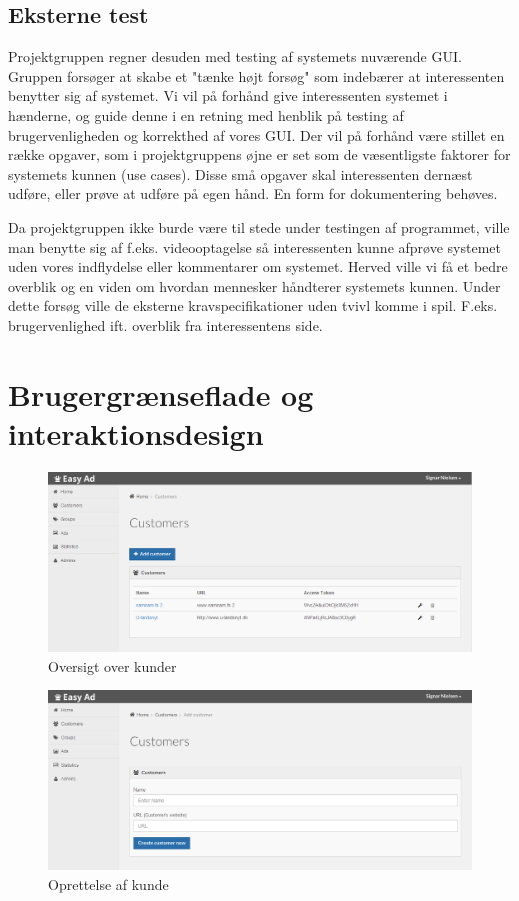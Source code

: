 \documentclass[a4paper,12pt]{article}
\begin{document}
\subsection{Eksterne test}
Projektgruppen regner desuden med testing af systemets nuværende GUI. Gruppen forsøger at skabe et "tænke højt forsøg" som indebærer at interessenten benytter sig af systemet. Vi vil på forhånd give interessenten systemet i hænderne, og guide denne i en retning med henblik på testing af brugervenligheden og korrekthed af vores GUI. Der vil på forhånd være stillet en række opgaver, som i projektgruppens øjne er set som de væsentligste faktorer for systemets kunnen (use cases). Disse små opgaver skal interessenten dernæst udføre, eller prøve at udføre på egen hånd. En form for dokumentering behøves. 

Da projektgruppen ikke burde være til stede under testingen af programmet, ville man benytte sig af f.eks. videooptagelse så interessenten kunne afprøve systemet uden vores indflydelse eller kommentarer om systemet. Herved ville vi få et bedre overblik og en viden om hvordan mennesker håndterer systemets kunnen.
Under dette forsøg ville de eksterne kravspecifikationer uden tvivl komme i spil. F.eks. brugervenlighed ift. overblik fra
interessentens side.




\newpage

\section{Brugergrænseflade og interaktionsdesign}
\begin{figure}[p]
  \centering
    \includegraphics[width=\textwidth]{customers.png}
  \caption{Oversigt over kunder}
\end{figure}

\begin{figure}[p]
  \centering
    \includegraphics[width=\textwidth]{customer_add.png}
  \caption{Oprettelse af kunde}
\end{figure}
\end{document}
